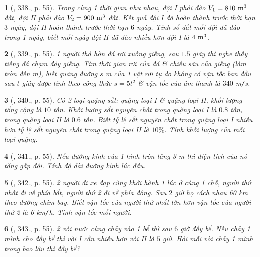 \documentclass{article}
\newtheorem{baitoan}{}
\begin{document}
\begin{baitoan}[\cite{Binh_Toan_9_tap_2}, 338., p. 55]
	Trong cùng 1 thời gian như nhau, đội I phải đào $V_1 = 810\ {\rm m}^3$ đất, đội II phải đào $V_2 = 900\ {\rm m}^3$ đất. Kết quả đội I đã hoàn thành trước thời hạn $3$ ngày, đội II hoàn thành trước thời hạn $6$ ngày. Tính số đất mỗi đội đã đào trong 1 ngày, biết mỗi ngày đội II đã đào nhiều hơn đội I là $\rm4\ m^3$.
\end{baitoan}

\begin{baitoan}[\cite{Binh_Toan_9_tap_2}, 339., p. 55]
	1 người thả hòn đá rơi xuống giếng, sau $1.5$ giây thì nghe thấy tiếng đá chạm đáy giếng. Tìm thời gian rơi của đá \& chiều sâu của giếng (làm tròn đến {\rm m}), biết quãng đường $s$ {\rm m} của 1 vật rơi tự do không có vận tốc ban đầu sau $t$ giây được tính theo công thức $s = 5t^2$ \& vận tốc của âm thanh là $340$ {\rm m{\tt/}s}.
\end{baitoan}

\begin{baitoan}[\cite{Binh_Toan_9_tap_2}, 340., p. 55]
	Có 2 loại quặng sắt: quặng loại I \& quặng loại II, khối lượng tổng cộng là $10$ tấn. Khối lượng sắt nguyên chất trong quặng loại I là $0.8$ tấn, trong quặng loại II là $0.6$ tấn. Biết tỷ lệ sắt nguyên chất trong quặng loại I nhiều hơn tỷ lệ sắt nguyên chất trong quặng loại II là $10\%$. Tính khối lượng của mỗi loại quặng.
\end{baitoan}

\begin{baitoan}[\cite{Binh_Toan_9_tap_2}, 341., p. 55]
	Nếu đường kính của 1 hình tròn tăng {\rm3 m} thì diện tích của nó tăng gấp đôi. Tính độ dài đường kính lúc đầu.
\end{baitoan}

\begin{baitoan}[\cite{Binh_Toan_9_tap_2}, 342., p. 55]
	2 người đi xe đạp cùng khởi hành 1 lúc ở cùng 1 chỗ, người thứ nhất đi về phía bắt, người thứ 2 đi về phía đông. Sau $2$ giờ họ cách nhau {\rm60 km} theo đường chim bay. Biết vận tốc của người thứ nhất lớn hơn vận tốc của người thứ 2 là {\rm6 km{\tt/}h}. Tính vận tốc mỗi người.
\end{baitoan}

\begin{baitoan}[\cite{Binh_Toan_9_tap_2}, 343., p. 55]
	2 vòi nước cùng chảy vào 1 bể thì sau $6$ giờ đầy bể. Nếu chảy 1 mình cho đầy bể thì vòi I cần nhiều hơn vòi II là $5$ giờ. Hỏi mỗi vòi chảy 1 mình trong bao lâu thì đầy bể?
\end{baitoan}
\end{document}

